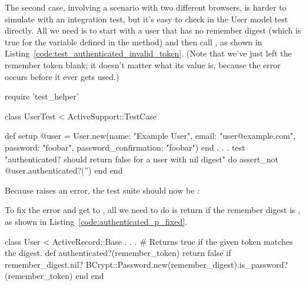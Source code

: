 The second case, involving a scenario with two different browsers, is harder to simulate with an integration test, but it's easy to check in the User model test directly. All we need is to start with a user that has no remember digest (which is true for the  variable defined in the  method) and then call , as shown in Listing~\ref{code:test_authenticated_invalid_token}. (Note that we've just left the remember token blank; it doesn't matter what its value is, because the error occurs before it ever gets used.)

\begin{codelisting}
\label{code:test_authenticated_invalid_token}
\begin{code}
require 'test_helper'

class UserTest < ActiveSupport::TestCase

  def setup
    @user = User.new(name: "Example User", email: "user@example.com",
                     password: "foobar", password_confirmation: "foobar")
  end
  .
  .
  .
  test "authenticated? should return false for a user with nil digest" do
    assert_not @user.authenticated?('')
  end
end
\end{code}
\end{codelisting}

Because  raises an error, the test suite should now be \failing:

\begin{codelisting}
\codecaption{\failing}
\end{codelisting}

To fix the error and get to \passing, all we need to do is return  if the remember digest is , as shown in Listing~\ref{code:authenticated_p_fixed}.

\begin{codelisting}
\label{code:authenticated_p_fixed}
\begin{code}
class User < ActiveRecord::Base
  .
  .
  .
  # Returns true if the given token matches the digest.
  def authenticated?(remember_token)
    return false if remember_digest.nil?
    BCrypt::Password.new(remember_digest).is_password?(remember_token)
  end
end
\end{code}
\end{codelisting}

